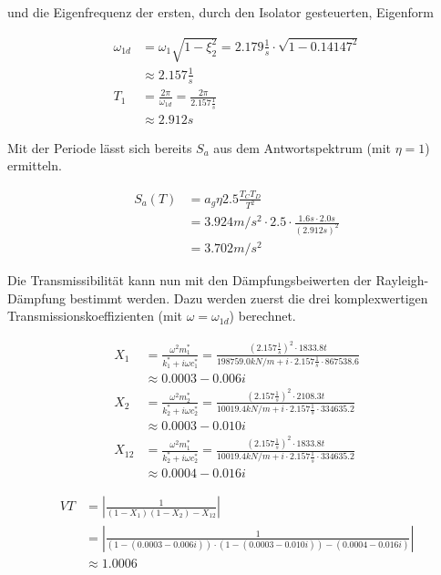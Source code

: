 und die Eigenfrequenz der ersten, durch den Isolator gesteuerten, Eigenform  

\begin{align*}
\omega_{1d} &= \omega_1 \sqrt{1 - \xi_2^2} = 2.179 \frac{1}{s} \cdot \sqrt{1 - 0.14147^2}\\
            &\approx 2.157 \frac{1}{s}\\
T_1         &= \frac{2 \pi}{\omega_{1d}} = \frac{2 \pi}{2.157 \frac{1}{s}}\\
            &\approx 2.912 s
\end{align*}

Mit der Periode lässt sich bereits $S_a$ aus dem Antwortspektrum (mit $\eta=1$) ermitteln.

\begin{align*}
S_a(T) &= a_g \eta 2.5 \frac{T_C T_D}{T^2}\\
       &= 3.924 m/s^2 \cdot 2.5 \cdot \frac{1.6 s \cdot 2.0 s}{(2.912 s)^2}\\
       &= 3.702 m/s^2
\end{align*}

Die Transmissibilität kann nun mit den Dämpfungsbeiwerten der Rayleigh-Dämpfung bestimmt werden. Dazu werden zuerst die drei komplexwertigen Transmissionskoeffizienten (mit $\omega = \omega_{1d}$) berechnet.

\begin{align*}
X_1 &= \frac{\omega^2 m_1^*}{k_1^* + i \omega c_1^*} = \frac{(2.157 \frac{1}{s})^2 \cdot 1833.8 t}{198759.0kN/m + i \cdot 2.157 \frac{1}{s} \cdot 867538.6}\\
    &\approx 0.0003 - 0.006i\\[2em]
X_2 &= \frac{\omega^2 m_2^*}{k_2^* + i \omega c_2^*} = \frac{(2.157 \frac{1}{s})^2 \cdot 2108.3 t}{10019.4kN/m + i \cdot 2.157 \frac{1}{s} \cdot 334635.2}\\
    &\approx 0.0003 - 0.010i\\[2em]
X_{12} &= \frac{\omega^2 m_1^*}{k_2^* + i \omega c_2^*} = \frac{(2.157 \frac{1}{s})^2 \cdot 1833.8 t}{10019.4kN/m + i \cdot 2.157 \frac{1}{s} \cdot 334635.2}\\
    &\approx 0.0004 - 0.016i
\end{align*}

\begin{align*}
VT &= \left\lvert \frac{1}{(1 - X_1)(1 - X_2) - X_{12}} \right\rvert\\
   &= \left\lvert \frac{1}{(1 - (0.0003 - 0.006i)) \cdot (1 - (0.0003 - 0.010i)) - (0.0004 - 0.016i)} \right\rvert\\
   &\approx 1.0006
\end{align*}

